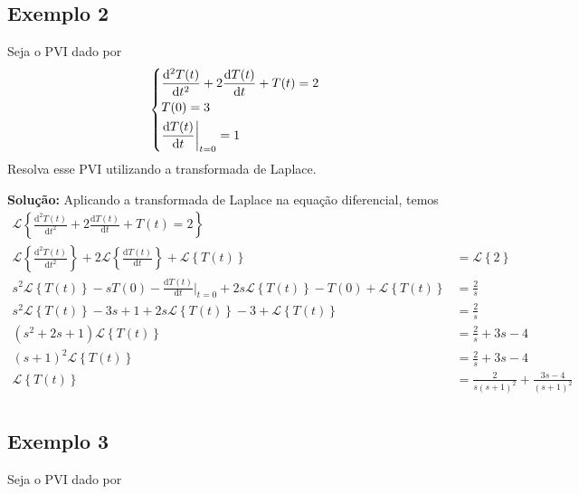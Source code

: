 \subsection{Exemplo 2}
Seja o PVI dado por
\begin{align}
    \begin{dcases}
        \frac{\mathrm{d}^2  T(t)}{\mathrm{d}t^2} + 2 \frac{\mathrm{d} T(t)}{\mathrm{d}t} + T(t) = 2 \\
        T(0) = 3\\
        \frac{\mathrm{d} T(t)}{\mathrm{d}t} \bigg|_{t=0} = 1\\
    \end{dcases}
\end{align}
Resolva esse PVI utilizando a transformada de Laplace. \par
\textbf{Solução:} Aplicando a transformada de Laplace na equação diferencial, temos
\begin{align}
    \mathscr{L} \left\{ \frac{\mathrm{d}^2  T(t)}{\mathrm{d}t^2} + 2 \frac{\mathrm{d} T(t)}{\mathrm{d}t} + T(t) = 2 \right\}\\
    \mathscr{L} \left\{ \frac{\mathrm{d}^2  T(t)}{\mathrm{d}t^2} \right\} + 2 \mathscr{L} \left\{ \frac{\mathrm{d} T(t)}{\mathrm{d}t} \right\} + \mathscr{L} \left\{ T(t) \right\} &= \mathscr{L} \left\{ 2 \right\}\\
    s^2 \mathscr{L} \left\{ T(t) \right\} - s T(0) - \frac{\mathrm{d} T(t)}{\mathrm{d}t} \bigg|_{t=0} + 2 s \mathscr{L} \left\{ T(t) \right\} - T(0) + \mathscr{L} \left\{ T(t) \right\} &= \frac{2}{s}\\
    s^2 \mathscr{L} \left\{ T(t) \right\} - 3 s + 1 + 2 s \mathscr{L} \left\{ T(t) \right\} - 3 + \mathscr{L} \left\{ T(t) \right\} &= \frac{2}{s}\\
    \left( s^2 + 2s + 1 \right) \mathscr{L} \left\{ T(t) \right\} &= \frac{2}{s} + 3 s - 4\\
    \left( s + 1 \right)^2 \mathscr{L} \left\{ T(t) \right\} &= \frac{2}{s} + 3 s - 4\\
    \mathscr{L} \left\{ T(t) \right\} &= \frac{2}{s \left( s + 1 \right)^2} + \frac{3 s - 4}{\left( s + 1 \right)^2}\\
\end{align}
\subsection{Exemplo 3}
Seja o PVI dado por

